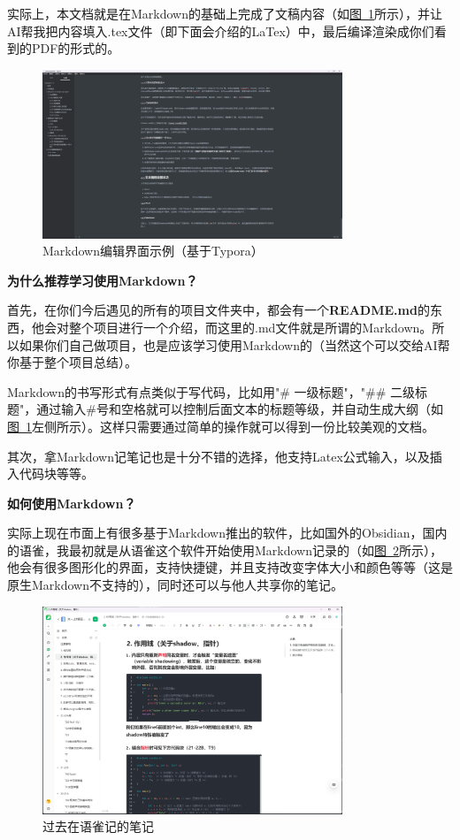 \documentclass[a4paper,12pt]{article}
\begin{document}
实际上，本文档就是在Markdown的基础上完成了文稿内容（如\hyperref[fig:markdown-editor]{图~\ref*{fig:markdown-editor}}所示），并让AI帮我把内容填入.tex文件（即下面会介绍的LaTex）中，最后编译渲染成你们看到的PDF的形式的。

\begin{figure}[h]
\centering
\includegraphics[width=0.8\textwidth]{images/image-20251001124259734.png}
\caption{Markdown编辑界面示例（基于Typora）}
\label{fig:markdown-editor}
\end{figure}

\textbf{为什么推荐学习使用Markdown？}

首先，在你们今后遇见的所有的项目文件夹中，都会有一个\textbf{README.md}的东西，他会对整个项目进行一个介绍，而这里的.md文件就是所谓的Markdown。所以如果你们自己做项目，也是应该学习使用Markdown的（当然这个可以交给AI帮你基于整个项目总结）。

Markdown的书写形式有点类似于写代码，比如用"\# 一级标题"，"\#\# 二级标题"，通过输入\#号和空格就可以控制后面文本的标题等级，并自动生成大纲（如\hyperref[fig:markdown-editor]{图~\ref*{fig:markdown-editor}}左侧所示）。这样只需要通过简单的操作就可以得到一份比较美观的文档。

其次，拿Markdown记笔记也是十分不错的选择，他支持Latex公式输入，以及插入代码块等等。

\textbf{如何使用Markdown？}

实际上现在市面上有很多基于Markdown推出的软件，比如国外的Obsidian，国内的语雀，我最初就是从语雀这个软件开始使用Markdown记录的（如\hyperref[fig:yuque-notes]{图~\ref*{fig:yuque-notes}}所示），他会有很多图形化的界面，支持快捷键，并且支持改变字体大小和颜色等等（这是原生Markdown不支持的），同时还可以与他人共享你的笔记。

\begin{figure}[h]
\centering
\includegraphics[width=0.8\textwidth]{images/image-20251001125306616.png}
\caption{过去在语雀记的笔记}
\label{fig:yuque-notes}
\end{figure}
\end{document}
